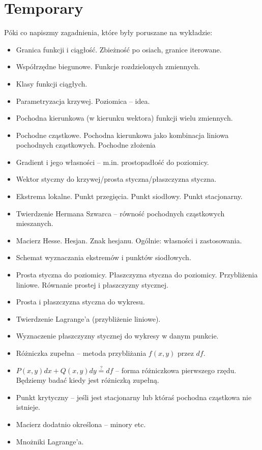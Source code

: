 \chapter{Temporary}

Póki co napiszmy zagadnienia, które były poruszane na wykładzie:
\begin{itemize}
	\item Granica funkcji i ciągłość. Zbieżność po osiach, granice iterowane.
	\item Współrzędne biegunowe. Funkcje rozdzielonych zmiennych.
	\item Klasy funkcji ciągłych.
	\item Parametryzacja krzywej. Poziomica -- idea.
	\item Pochodna kierunkowa (w kierunku wektora) funkcji wielu zmiennych.
	\item Pochodne cząstkowe. Pochodna kierunkowa jako kombinacja liniowa pochodnych cząstkowych. Pochodne złożenia
	\item Gradient i jego własności -- m.in. prostopadłość do poziomicy.
	\item Wektor styczny do krzywej/prosta styczna/płaszczyzna styczna.
	\item Ekstrema lokalne. Punkt przegięcia. Punkt siodłowy. Punkt stacjonarny.
	\item Twierdzenie Hermana Szwarca -- równość pochodnych cząstkowych mieszanych.
	\item Macierz Hesse. Hesjan. Znak hesjanu. Ogólnie: własności i zastosowania.
	\item Schemat wyznaczania ekstremów i punktów siodłowych.
	\item Prosta styczna do poziomicy. Płaszczyzna styczna do poziomicy. Przybliżenia liniowe. Równanie prostej i płaszczyzny stycznej.
	\item Prosta i płaszczyzna styczna do wykresu.
	\item Twierdzenie Lagrange'a (przybliżenie liniowe).
	\item Wyznaczenie płaszczyzny stycznej do wykresy w danym punkcie.
	\item Różniczka zupełna -- metoda przybliżania $f\left( x,y \right) $ przez $df$.
	\item $P\left( x,y \right) dx + Q\left( x,y \right) dy \overset{?}{=} df$ -- forma różniczkowa pierwszego rzędu. Będziemy badać kiedy jest różniczką zupełną.
	\item Punkt krytyczny -- jeśli jest stacjonarny lub któraś pochodna cząstkowa nie istnieje.
	\item Macierz dodatnio określona -- minory etc.
	\item Mnożniki Lagrange'a. 
\end{itemize}
